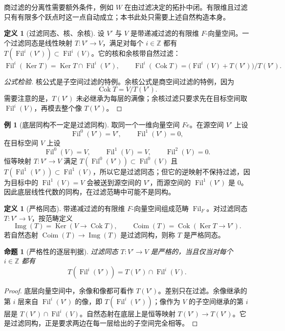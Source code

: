 \documentclass[11pt,a4paper,openany]{ctexbook}
\numberwithin{equation}{chapter}
\newcommand{\Z}{\mathbb{Z}}
\newcommand{\Ker}{\operatorname{Ker}}
\newcommand{\Fil}{\operatorname{Fil}}
\theoremstyle{plain}
\newtheorem{proposition}[theorem]{命题}
\theoremstyle{definition}
\newtheorem{definition}[theorem]{定义}
\newtheorem{example}[theorem]{例}
\theoremstyle{remark}
\begin{document}
商过滤的分离性需要额外条件，例如 $W$ 在由过滤决定的拓扑中闭。有限维且过滤只有有限多个跃点时这一点自动成立；本书此处只需要上述自然构造本身。

\begin{definition}[过滤同态、核、余核]
设 $V'$ 与 $V$ 是带递减过滤的有限维 $F$-向量空间。一个过滤同态是线性映射 $T:V'\to V$，满足对每个 $i\in\Z$ 都有 $T(\Fil^i(V'))\subset \Fil^i(V)$。它的核和余核带自然过滤：
\[
\Fil^i(\Ker T)=\Ker T\cap\Fil^i(V'),
\qquad
\Fil^i(\operatorname{Cok}T)=\bigl(\Fil^i(V)+T(V')\bigr)/T(V').
\]
\end{definition}

\begin{proof}[公式检验]
核公式是子空间过滤的特例。余核公式是商空间过滤的特例，因为
\[
\operatorname{Cok}T=V/T(V').
\]
需要注意的是，$T(V')$ 未必继承为每层的满像；余核过滤只要求先在目标空间取 $\Fil^i(V)$，再模去整个像 $T(V')$。
\end{proof}

\begin{example}[底层同构不一定是过滤同构]
取同一个一维向量空间 $Fe$。在源空间 $V'$ 上设
\[
\Fil^0(V')=V',\qquad \Fil^1(V')=0,
\]
在目标空间 $V$ 上设
\[
\Fil^0(V)=V,\qquad \Fil^1(V)=V,\qquad \Fil^2(V)=0.
\]
恒等映射 $T:V'\to V$ 满足 $T(\Fil^0(V'))\subset\Fil^0(V)$ 且 $T(\Fil^1(V'))\subset\Fil^1(V)$，所以它是过滤同态；但它的逆映射不保持过滤，因为目标中的 $\Fil^1(V)=V$ 会被送到源空间的 $V'$，而源空间的 $\Fil^1(V')$ 是 $0$。因此底层线性代数的同构，在过滤范畴中可能不是同构。
\end{example}

\begin{definition}[严格同态]
带递减过滤的有限维 $F$-向量空间组成范畴 $\operatorname{Fil}_F$。对过滤同态 $T:V'\to V$，按范畴定义
\[
\operatorname{Img}(T)=\Ker(V\to\operatorname{Cok}T),
\qquad
\operatorname{Coim}(T)=\operatorname{Cok}(\Ker T\to V').
\]
若自然态射 $\operatorname{Coim}(T)\to\operatorname{Img}(T)$ 是过滤同构，则称 $T$ 是严格同态。
\end{definition}

\begin{proposition}[严格性的逐层判据]
过滤同态 $T:V'\to V$ 是严格的，当且仅当对每个 $i\in\Z$ 都有
\[
T(\Fil^i(V'))=T(V')\cap\Fil^i(V).
\]
\end{proposition}

\begin{proof}
底层向量空间中，余像和像都可看作 $T(V')$。差别只在过滤。余像继承的第 $i$ 层来自 $\Fil^i(V')$ 的像，即 $T(\Fil^i(V'))$；像作为 $V$ 的子空间继承的第 $i$ 层是 $T(V')\cap\Fil^i(V)$。自然态射在底层上是恒等映射 $T(V')\to T(V')$。它是过滤同构，正是要求两边在每一层给出的子空间完全相等。
\end{proof}
\end{document}
